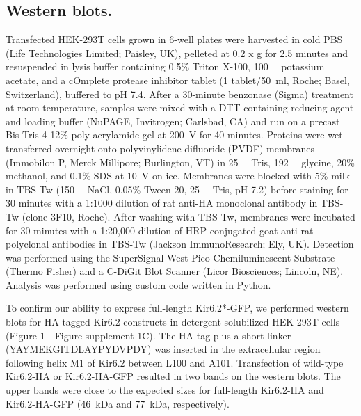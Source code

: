 \documentclass[10pt,lineno, doublespacing]{elife}
\begin{document}
\subsection{Western blots.}
Transfected HEK-293T cells grown in 6-well plates were harvested in cold PBS (Life Technologies Limited; Paisley, UK), pelleted at 0.2 x g for 2.5 minutes and resuspended in lysis buffer containing 0.5\% Triton X-100, \SI{100}{\milli\Molar} potassium acetate, and a cOmplete protease inhibitor tablet (1 tablet/\SI{50}{\milli\litre}, Roche; Basel, Switzerland), buffered to pH 7.4.
After a 30-minute benzonase (Sigma) treatment at room temperature, samples were mixed with a DTT containing reducing agent and loading buffer (NuPAGE, Invitrogen; Carlsbad, CA) and run on a precast Bis-Tris 4-12\% poly-acrylamide gel at \SI{200}{\volt} for 40 minutes.
Proteins were wet transferred overnight onto polyvinylidene difluoride (PVDF) membranes (Immobilon P, Merck Millipore; Burlington, VT) in \SI{25}{\milli\Molar} Tris, \SI{192}{\milli\Molar} glycine, 20\% methanol, and 0.1\% SDS at \SI{10}{\volt} on ice.
Membranes were blocked with 5\% milk in TBS-Tw (\SI{150}{\milli\Molar} NaCl, 0.05\% Tween 20, \SI{25}{\milli\Molar} Tris, pH 7.2) before staining for 30 minutes with a 1:1000 dilution of rat anti-HA monoclonal antibody in TBS-Tw (clone 3F10, Roche).
After washing with TBS-Tw, membranes were incubated for 30 minutes with a 1:20,000 dilution of HRP-conjugated goat anti-rat polyclonal antibodies in TBS-Tw (Jackson ImmunoResearch; Ely, UK).
Detection was performed using the SuperSignal West Pico Chemiluminescent Substrate (Thermo Fisher) and a C-DiGit Blot Scanner (Licor Biosciences; Lincoln, NE).
Analysis was performed using custom code written in Python.

To confirm our ability to express full-length Kir6.2*-GFP, we performed western blots for HA-tagged Kir6.2 constructs in detergent-solubilized HEK-293T cells (Figure 1—Figure supplement 1C).
The HA tag plus a short linker (YAYMEKGITDLAYPYDVPDY) was inserted in the extracellular region following helix M1 of Kir6.2 between L100 and A101.
Transfection of wild-type Kir6.2-HA or Kir6.2-HA-GFP resulted in two bands on the western blots.
The upper bands were close to the expected sizes for full-length Kir6.2-HA and Kir6.2-HA-GFP (\SI{46}{\kilo\dalton} and \SI{77}{\kilo\dalton}, respectively).
\end{document}

